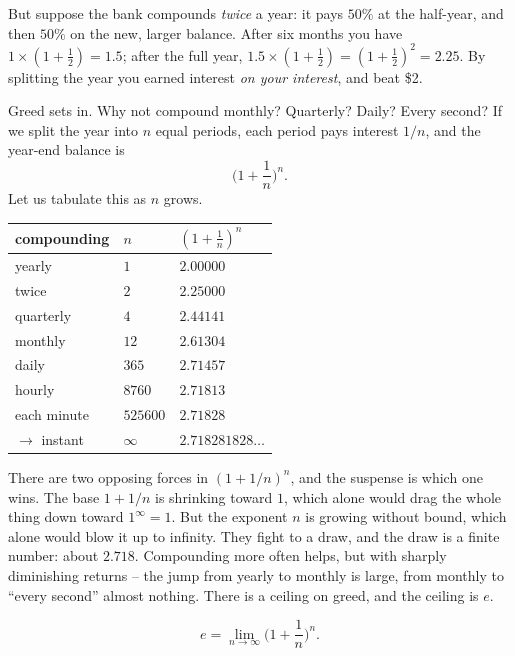But suppose the bank compounds \emph{twice} a year: it pays $50\%$ at the half-year, and then $50\%$ on the new, larger balance. After six months you have $1\times(1+\tfrac12)=1.5$; after the full year, $1.5\times(1+\tfrac12)=(1+\tfrac12)^2 = 2.25$. By splitting the year you earned interest \emph{on your interest}, and beat \$2.

Greed sets in. Why not compound monthly? Quarterly? Daily? Every second? If we split the year into $n$ equal periods, each period pays interest $1/n$, and the year-end balance is
\[
\Big(1+\frac1n\Big)^{n}.
\]
Let us tabulate this as $n$ grows.

\begin{center}
\begin{tabular}{@{}lll@{}}
\toprule
compounding & $n$ & $\left(1+\tfrac1n\right)^n$ \\
\midrule
yearly      & $1$        & $2.00000$ \\
twice       & $2$        & $2.25000$ \\
quarterly   & $4$        & $2.44141$ \\
monthly     & $12$       & $2.61304$ \\
daily       & $365$      & $2.71457$ \\
hourly      & $8760$     & $2.71813$ \\
each minute & $525600$   & $2.71828$ \\
$\to$ instant & $\infty$ & $2.718281828\ldots$ \\
\bottomrule
\end{tabular}
\end{center}

\begin{intuitionbox}
There are two opposing forces in $(1+1/n)^n$, and the suspense is which one wins. The base $1+1/n$ is shrinking toward $1$, which alone would drag the whole thing down toward $1^\infty=1$. But the exponent $n$ is growing without bound, which alone would blow it up to infinity. They fight to a draw, and the draw is a finite number: about $2.718$. Compounding more often helps, but with sharply diminishing returns -- the jump from yearly to monthly is large, from monthly to ``every second'' almost nothing. There is a ceiling on greed, and the ceiling is $e$.
\end{intuitionbox}

\begin{definition}\label{ch03:def-e-limit}
\[
e = \lim_{n\to\infty}\Big(1+\frac1n\Big)^{n}.
\]
\end{definition}

